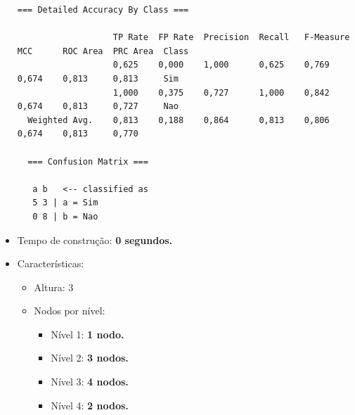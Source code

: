 \documentclass[
    article,            %
    11pt,               %
    oneside,            %
    a4paper,            %
    english,            %
    brazil,             %
    sumario=tradicional,
    ]{abntex2}
\begin{document}
\begin{itemize}
\begin{Verbatim}[frame=single, fontsize=\tiny]
  === Detailed Accuracy By Class ===

                   TP Rate  FP Rate  Precision  Recall   F-Measure  MCC      ROC Area  PRC Area  Class
                   0,625    0,000    1,000      0,625    0,769      0,674    0,813     0,813     Sim
                   1,000    0,375    0,727      1,000    0,842      0,674    0,813     0,727     Nao
  Weighted Avg.    0,813    0,188    0,864      0,813    0,806      0,674    0,813     0,770     

  === Confusion Matrix ===

   a b   <-- classified as
   5 3 | a = Sim
   0 8 | b = Nao
  \end{Verbatim}

  \item Tempo de construção: \textbf{0 segundos.}
  
  \item Características:
  \begin{itemize}
    \item Altura: 3
    \item Nodos por nível:
    \begin{itemize}
      \item Nível 1: \textbf{1 nodo.}
      \item Nível 2: \textbf{3 nodos.}
      \item Nível 3: \textbf{4 nodos.}
      \item Nível 4: \textbf{2 nodos.}
    \end{itemize}
  \end{itemize}
\end{itemize}   

\newpage
\end{document}
